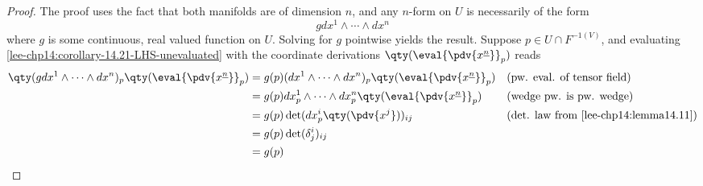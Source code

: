 \documentclass[../main-v2-manifolds.tex]{subfiles}
\begin{document}
    \begin{proof}
        The proof uses the fact that both manifolds are of dimension $n$, and any $n$-form on $U$ is necessarily of the form
        \begin{equation}\label{lee-chp14:corollary-14.21-LHS-unevaluated}
            gdx^1\wedge\cdots\wedge dx^n
        \end{equation}
        where $g$ is some continuous, real valued function on $U$. Solving for $g$ pointwise yields the result. Suppose $p\in U\cap F^{-1(V)}$, and evaluating \cref{lee-chp14:corollary-14.21-LHS-unevaluated} with the coordinate derivations $\qty(\eval{\pdv{x^{\underline{n}}}}_p)$ reads
        \begin{align*}
            \qty(gdx^1\wedge\cdots\wedge dx^n)_p\qty(\eval{\pdv{x^{\underline{n}}}}_p) &= g(p)(dx^1\wedge\cdots\wedge dx^n)_p\qty(\eval{\pdv{x^{\underline{n}}}}_p) &&\text{(pw. eval. of tensor field)}\\
            &= g(p)dx^1_p\wedge\cdots\wedge dx^n_p\qty(\eval{\pdv{x^{\underline{n}}}}_p) && \text{(wedge pw. is pw. wedge)}\\
            &= g(p)\det(dx^i_p\qty(\pdv{x^j}))_{ij}&& \text{(det. law from \Cref{lee-chp14:lemma14.11})}\\
            &= g(p) \det(\delta^{i}_j)_{ij}\\
            &= g(p)
        \end{align*}
        

\end{proof}
\end{document}
